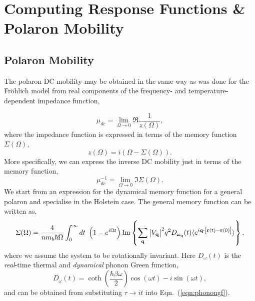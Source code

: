 \chapter{Computing Response Functions \& Polaron Mobility}
\label{chap:fifth}



\section{Polaron Mobility}
\label{sec:chap-fifth-first}

The polaron DC mobility may be obtained in the same way as was done for the Fr\"ohlich model from real components of the frequency- and temperature-dependent impedance function,

\begin{equation}\label{eqn:mobility}
    \mu_{dc} = \lim_{\Omega \to 0} \Re{\frac{1}{z(\Omega)}},
\end{equation}
where the impedance function is expressed in terms of the memory function $\Sigma(\Omega)$,
\begin{equation}
    z(\Omega) = i \left( \Omega - \Sigma(\Omega) \right).
\end{equation}
More specifically, we can express the inverse DC mobility just in terms of the memory function,
\begin{equation}
    \mu_{dc}^{-1} = \lim_{\Omega \to 0} \Im{\Sigma(\Omega)}.
\end{equation}
We start from an expression for the dynamical memory function for a general polaron and specialise in the Holstein case. The general memory function can be written as,
\begin{equation}
    \Sigma(\Omega) = \frac{4}{n m_b \hbar\Omega} \int_0^{\infty} dt\ \left(1 - e^{i \Omega t}\right) \Im \left\{ \sum_{\vb{q}} \abs{V_{\vb{q}}}^2 q^2 D_{\omega_{\vb{q}}}(t) \langle e^{i \vb{q} \cdot \left[ \vb{r}(t) - \vb{r}(0) \right]} \rangle \right\},
\end{equation}
where we assume the system to be rotationally invariant. Here $D_{\omega}(t)$ is the \emph{real}-time thermal and \emph{dynamical} phonon Green function,
\begin{equation}
    D_\omega(t) = \coth(\frac{\hbar \beta \omega}{2}) \cos(\omega t) - i \sin(\omega t),
\end{equation}
and can be obtained from substituting $\tau \to i t$ into Eqn.~(\ref{eqn:phonongf}).

